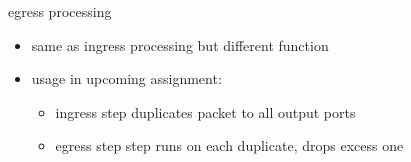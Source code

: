 \begin{frame}{egress processing}
    \begin{itemize}
    \item same as ingress processing but different function
    \vspace{.5cm}
    \item usage in upcoming assignment:
        \begin{itemize}
        \item ingress step duplicates packet to all output ports
        \item egress step step runs on each duplicate, drops excess one
        \end{itemize}
    \end{itemize}
\end{frame}
